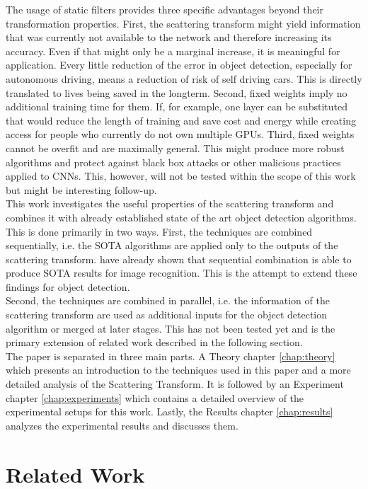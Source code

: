 The usage of static filters provides three specific advantages beyond their transformation properties. First, the scattering transform might yield information that was currently not available to the network and therefore increasing its accuracy. Even if that might only be a marginal increase, it is meaningful for application. Every little reduction of the error in object detection, especially for autonomous driving, means a reduction of risk of self driving cars. This is directly translated to lives being saved in the longterm. 
Second, fixed weights imply no additional training time for them. If, for example, one layer can be substituted that would reduce the length of training and save cost and energy while creating access for people who currently do not own multiple GPUs.
Third, fixed weights cannot be overfit and are maximally general. This might produce more robust algorithms and protect against black box attacks or other malicious practices applied to CNNs. This, however, will not be tested within the scope of this work but might be interesting follow-up.\\
This work investigates the useful properties of the scattering transform and combines it with already established state of the art object detection algorithms. This is done primarily in two ways. First, the techniques are combined sequentially, i.e. the SOTA algorithms are applied only to the outputs of the scattering transform. \cite{ScalingTheScatteringTransform2017}
have already shown that sequential combination is able to produce SOTA results for image recognition. This is the attempt to extend these findings for object detection. \\
Second, the techniques are combined in parallel, i.e. the information of the scattering transform are used as additional inputs for the object detection algorithm or merged at later stages. This has not been tested yet and is the primary extension of related work described in the following section.\\
The paper is separated in three main parts. A Theory chapter \ref{chap:theory} which presents an introduction to the techniques used in this paper and a more detailed analysis of the Scattering Transform. It is followed by an Experiment chapter \ref{chap:experiments} which contains a detailed overview of the experimental setups for this work. Lastly, the Results chapter \ref{chap:results} analyzes the experimental results and discusses them. 


\section{Related Work}

